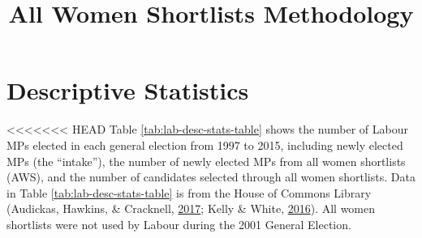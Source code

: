 \documentclass[]{article}
\title{All Women Shortlists Methodology}
\author{}
\date{}
\theoremstyle{definition}
\theoremstyle{definition}
\theoremstyle{definition}
\theoremstyle{remark}
\begin{document}
\maketitle

{
\setcounter{tocdepth}{3}
\tableofcontents
}
\listoftables
\listoffigures
\clearpage

\hypertarget{descriptive-statistics}{%
\section{Descriptive Statistics}\label{descriptive-statistics}}

<<<<<<< HEAD
Table \ref{tab:lab-desc-stats-table} shows the number of Labour MPs
elected in each general election from 1997 to 2015, including newly
elected MPs (the ``intake''), the number of newly elected MPs from all
women shortlists (AWS), and the number of candidates selected through
all women shortlists. Data in Table \ref{tab:lab-desc-stats-table} is
from the House of Commons Library (Audickas, Hawkins, \& Cracknell,
\protect\hyperlink{ref-audickas2017}{2017}; Kelly \& White,
\protect\hyperlink{ref-kelly2016}{2016}). All women shortlists were not
used by Labour during the 2001 General Election.
\end{document}
